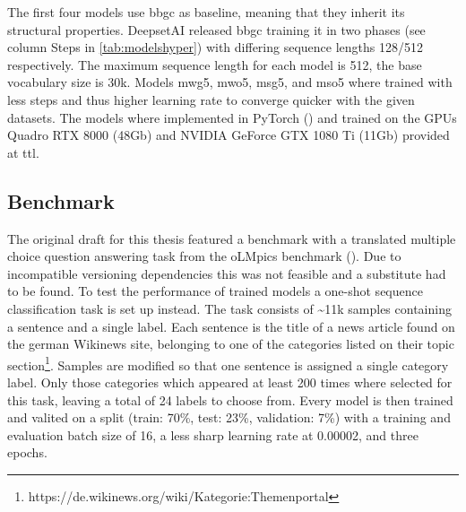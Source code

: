 The first four models use bbgc as baseline, meaning that they inherit its structural properties.
DeepsetAI released bbgc training it in two phases (see column Steps in \autoref{tab:modelshyper}) with differing sequence lengths 128/512 respectively.
The maximum sequence length for each model is 512, the base vocabulary size is 30k.
Models mwg5, mwo5, msg5, and mso5 where trained with less steps and thus higher learning rate to converge quicker with the given datasets.
The models where implemented in PyTorch (\textcite{pytorch}) and trained on the GPUs Quadro RTX 8000 (48Gb) and NVIDIA GeForce GTX 1080 Ti (11Gb) provided at \ac{ttl}.

\subsection{Benchmark}
\label{subsec:benchmark-implementation}
The original draft for this thesis featured a benchmark with a translated multiple choice question answering task from the oLMpics benchmark (\cite{olmpics}).
Due to incompatible versioning dependencies this was not feasible and a substitute had to be found.
To test the performance of trained models a one-shot sequence classification task is set up instead.
The task consists of \textasciitilde11k samples containing a sentence and a single label.
Each sentence is the title of a news article found on the german Wikinews site, belonging to one of the categories listed on their topic section\footnote{https://de.wikinews.org/wiki/Kategorie:Themenportal}.
Samples are modified so that one sentence is assigned a single category label.
Only those categories which appeared at least 200 times where selected for this task, leaving a total of 24 labels to choose from.
Every model is then trained and valited on a split (train: 70\%, test: 23\%, validation: 7\%) with a training and evaluation batch size of 16, a less sharp learning rate at 0.00002, and three epochs.
